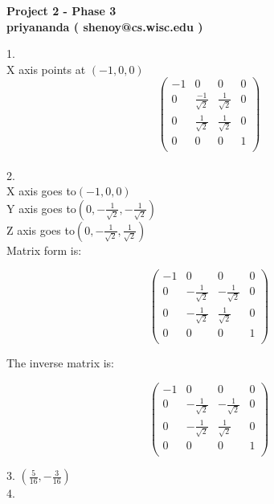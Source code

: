 \documentclass[11pt]{article}
\begin{document}
\begin{center}
\textbf{Project 2 - Phase 3}\\
\textbf{priyananda ( shenoy@cs.wisc.edu )}\\
\end{center}

1.\\
	X axis points at $(-1,0,0)$ \\
	\[ \left( \begin{array}{cccc}
	-1 & 0    									& 0 					 		& 0 \\
	0  & \frac{-1}{\sqrt{2}} 	& \frac{1}{\sqrt{2}} 	& 0 \\
	0  & \frac{1}{\sqrt{2}}  	& \frac{1}{\sqrt{2}} 	& 0 \\
	0  & 0 											& 0 										& 1 \\
	\end{array} \right) \]
\\
2.\\
	X axis goes to$(-1,0,0)$\\
	Y axis goes to$(0,-\frac{1}{\sqrt{2}},-\frac{1}{\sqrt{2}})$\\
	Z axis goes to$(0,-\frac{1}{\sqrt{2}},\frac{1}{\sqrt{2}})$\\
	
	Matrix form is:
	
	\[ \left( \begin{array}{cccc}
	-1 & 0    & 0 & 0\\
	0  & -\frac{1}{\sqrt{2}} & -\frac{1}{\sqrt{2}} & 0 \\
	0  & -\frac{1}{\sqrt{2}} & \frac{1}{\sqrt{2}} & 0 \\
	0  & 0 & 0 & 1 \\
	\end{array} \right) \]
	
	The inverse matrix is:
	
	\[ \left( \begin{array}{cccc}
	-1 & 0    & 0 & 0\\
	0  & -\frac{1}{\sqrt{2}} & -\frac{1}{\sqrt{2}} & 0 \\
	0  & -\frac{1}{\sqrt{2}}  & \frac{1}{\sqrt{2}} & 0 \\
	0  & 0 & 0 & 1 \\
	\end{array} \right) \]

3. $( \frac{5}{16} , -\frac{3}{16} )$ \\

4.
\begin{figure}[h]
\begin{center}
\end{center}
\end{figure}
\end{document}
